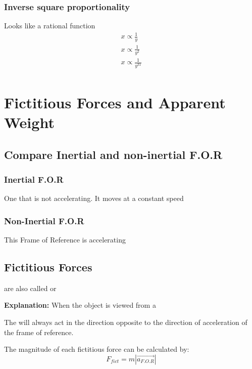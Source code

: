 \subsubsection*{Inverse square proportionality}
Looks like a rational function\\
\begin{gather*}
    x \propto \frac{1}{y}\\
     x \propto \frac{1}{y^2}\\
      x \propto \frac{1}{y^31}\\
\end{gather*}

\section{Fictitious Forces and Apparent Weight}
\subsection{Compare Inertial and non-inertial F.O.R}
\subsubsection{Inertial F.O.R}
One that is not accelerating. It moves at a constant speed\\

\subsubsection{Non-Inertial F.O.R}
This Frame of Reference is accelerating
\subsection{Fictitious Forces}
 are also called  or 

\begin{redblock}
    \textbf{Explanation:} When the object is viewed from a 
\end{redblock}

The  will always act in the direction opposite to the direction of acceleration of 
the frame of reference.\\

\begin{cyanblock}
    The magnitude of each fictitious force can be calculated by:
    \[
        F_{fict} = m|\vec{a_{F.O.R}}|
    \]
\end{cyanblock}

